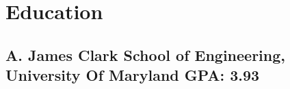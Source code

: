 \documentclass[print]{jack-resume}
\begin{document}
\section{Education}
\subsection{A. James Clark School of Engineering, University Of Maryland \hfill GPA: 3.93}

\begin{minipage}[t]{0.04\textwidth}
    \hfill
\end{minipage}
\end{document}
